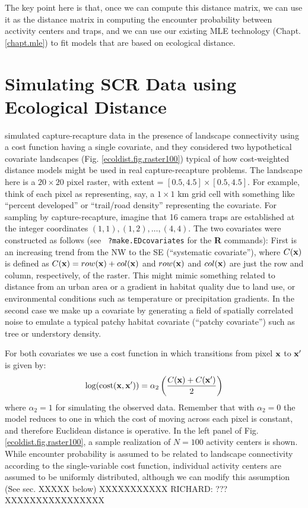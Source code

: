 The key point here is that, once we can compute this distance matrix,
we can use it as the distance matrix in computing the encounter
probability between acctivity centers and traps, and we can use our
existing MLE technology (Chapt. \ref{chapt.mle}) to fit models that
are based on ecological distance.



\section{Simulating SCR Data using Ecological Distance}
\label{ecoldist.sec.simulating}

\citet{royle_etal:2012ecol} simulated capture-recapture data in the
presence of landscape connectivity using a cost function having a
single covariate, and they considered two hypothetical covariate
landscapes
(Fig. \ref{ecoldist.fig.raster100})
typical of how
cost-weighted distance models might be used in real capture-recapture
problems.  The landscape here is
 a $20 \times 20$ pixel raster, with
extent = $[0.5, 4.5] \times [0.5, 4.5]$.
For example, think of each pixel as
representing, say, a $1 \times 1$ km grid cell with something like
``percent developed'' or ``trail/road density'' representing the
covariate. For sampling by capture-recapture, imagine
that 16 camera traps are established at the integer coordinates
$(1,1), (1,2), \ldots, (4,4)$.
The two covariates were constructed as follows (see \mbox{\tt
  ?make.EDcovariates} for the {\bf R} commands):
First is an increasing trend from
the NW to the SE (``systematic covariate''), where $C({\bf x})$ is defined as
$C({\bf x}) = row({\bf x}) + col({\bf x})$ and $row({\bf x})$ and $col({\bf x})$ are just the row and
column, respectively, of the raster.  This might mimic something
related to distance from an urban area or a gradient in habitat
quality due to land use, or environmental conditions such as
temperature or precipitation gradients.  In the second case we make up
a covariate by generating a field of spatially correlated noise to
emulate a typical patchy habitat covariate (``patchy covariate'') such as
tree or understory density.

For both covariates we use a
cost function in which transitions from pixel ${\bf x}$ to ${\bf x}'$
is given by:
\[
 \log(\mbox{cost}({\bf x},{\bf x}'))=  \alpha_2 \left( \frac{C({\bf
       x}) + C({\bf x}')}{2} \right)
\]
where $\alpha_2 = 1$ for simulating the observed data.
 Remember that with $\alpha_2=0$ the
model reduces to one in which the cost of moving across each pixel is
constant, and therefore Euclidean distance is operative.
In the left panel of
Fig. \ref{ecoldist.fig.raster100}, a sample realization of
$N=100$ activity centers is shown. While encounter probability is
assumed to be related to landscape connectivity according to the
single-variable cost function, individual activity centers are
assumed to be uniformly distributed, although we can modify this
assumption (See sec. XXXXX below) XXXXXXXXXXX RICHARD: ??? XXXXXXXXXXXXXXXX


